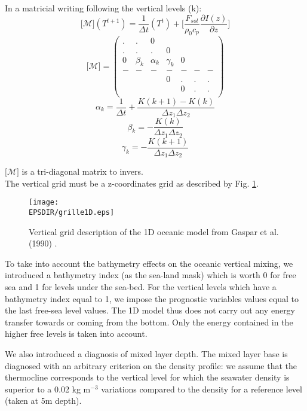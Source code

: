 In a matricial writing following the vertical levels (k):
\begin{equation}
\lbrack\mathcal{M}\rbrack\left(T^{t+1}\right)=\frac{1}{\Delta t}\left(T^{t}\right)+\lbrack\frac{F_{sol}}{\rho_{0}c_{p}}\frac{\partial I(z)}{\partial z}\rbrack
\end{equation}
\begin{equation}
\lbrack\mathcal{M}\rbrack=\left(
\begin{array}{ccccccc}
. & . & 0 & & & & \\
. & . & . & 0 & & & \\
0 & \beta_{k} & \alpha_{k} & \gamma_{k} & 0 & &\\
- & - & - & - & - & - & - \\
 & & & 0 & . & . & .\\
 & & & & 0 & . & .\\
\end{array}
\right)
\end{equation}
$$\alpha_{k}=\frac{1}{\Delta t}+\frac{K(k+1)-K(k)}{\Delta z_{1}\Delta z_{2}}$$
$$\beta_{k}=-\frac{K(k)}{\Delta z_{1}\Delta z_{2}}$$
$$\gamma_{k}=-\frac{K(k+1)}{\Delta z_{1}\Delta z_{2}}$$

$\lbrack\mathcal{M}\rbrack$ is a tri-diagonal matrix to invers. \\

The vertical grid must be a z-coordinates grid as described by Fig. \ref{grille1}. 
\begin{figure}[!h]
\centering\texttt{[image: \\EPSDIR/grille1D.eps]}
\caption{Vertical grid description of the 1D oceanic model from Gaspar et al. (1990) %
.  \label{grille1}}
\end{figure}

To take into account the bathymetry effects on the oceanic vertical mixing, we introduced a bathymetry index (as the sea-land mask) which is worth 0 for free sea and 1 for levels under the sea-bed. For the vertical levels which have a bathymetry index equal to 1, we impose the prognostic variables values equal to the last free-sea level values. The 1D model thus does not carry out any energy transfer towards or coming from the bottom. Only the energy contained in the higher free levels is taken into account. 

We also introduced a diagnosis of mixed layer depth. The mixed layer base is diagnosed with an arbitrary criterion on the density profile: we assume that the thermocline corresponds to the vertical level for which the seawater density is superior to a 0.02 kg m$^{-3}$ variations compared to the density for a reference level (taken at 5m depth).  

